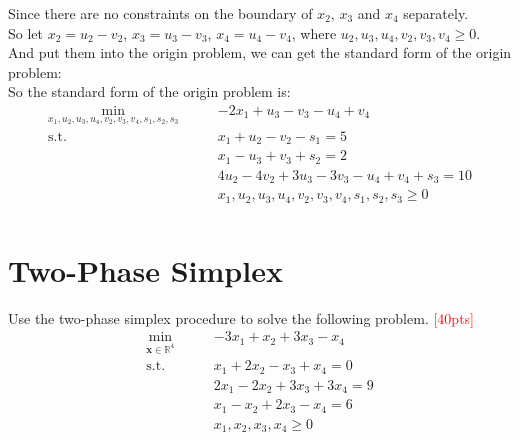 \documentclass[10pt]{article}
\begin{document}
Since there are no constraints on the boundary of $x_2$, $x_3$ and $x_4$ separately.\\
So let $x_2 = u_2 - v_2$, $x_3 = u_3 - v_3$, $x_4 = u_4 - v_4$, where $u_2,u_3,u_4,v_2,v_3,v_4\geq 0$.\\
And put them into the origin problem, we can get the standard form of the origin problem:\\

So the standard form of the origin problem is:\\
\begin{equation}
	\begin{aligned}
		\min_{x_1,u_2,u_3,u_4,v_2,v_3,v_4,s_1,s_2,s_3}\qquad & -2x_1 + u_3 - v_3 - u_4 + v_4 \\
		\mathrm{s.t.}\qquad & x_{1} + u_2 - v_2 - s_1 = 5 \\
							& x_{1} - u_3 + v_3 + s_2 = 2 \\
							& 4u_2 - 4v_2 + 3u_3 - 3v_3 - u_4 + v_4 + s_3 = 10 \\
							& x_1,u_2,u_3,u_4,v_2,v_3,v_4,s_1,s_2,s_3 \geq 0 \\
	\end{aligned}
\end{equation}

\newpage

\section{Two-Phase Simplex}
Use the two-phase simplex procedure to solve the following problem. \textcolor{red}{[40pts]}
\begin{equation}
	\begin{aligned}
		\min_{\bm{x} \in \mathbb{R}^{4}}\qquad & -3x_{1} + x_{2} + 3x_{3} - x_{4} \\
		\mathrm{s.t.}\qquad & x_{1} + 2x_{2} - x_{3} + x_{4} = 0 \\
							  & 2x_{1} - 2x_{2} + 3x_{3} + 3x_{4} = 9 \\
							  & x_{1} - x_{2} + 2x_{3} - x_{4} = 6 \\
							  & x_{1}, x_{2}, x_{3}, x_{4} \geq 0 \\
	\end{aligned}
\end{equation}
\end{document}
